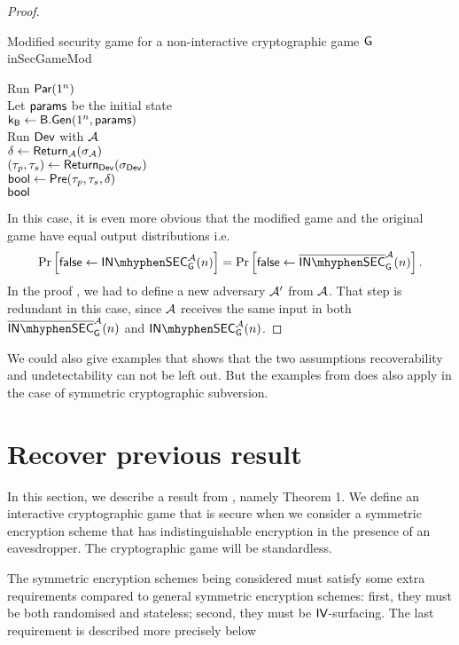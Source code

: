 \begin{proof}
\begin{boxfigGame}{Modified security game for a non-interactive cryptographic game $\operatorname{\mathsf{G}}$}{inSecGameMod}
\begin{description}
 		Run $\operatorname{\mathsf{Par}}(1^n)$ \\
 		Let $\mathsf{params}$ be the initial state \\
 		$\mathsf{k}_{\mathsf{B}}\leftarrow\mathsf{B}.\mathsf{Gen}(1^n,\mathsf{params})$ \\
		Run $\operatorname{\mathsf{Dev}}$ with $\mathcal{A}$ \\
 		$\delta\leftarrow\operatorname{\mathsf{Return}}_{\mathcal{A}}(\sigma_{\mathcal{A}})$ \\
 		$(\tau_p,\tau_s)\leftarrow \operatorname{\mathsf{Return}}_{\operatorname{\mathsf{Dev}}}(\sigma_{\operatorname{\mathsf{Dev}}})$ \\
 		$\mathsf{bool} \leftarrow \operatorname{\mathsf{Pre}}(\tau_p,\tau_s,\delta)$ \\
 		\Ret $\mathsf{bool}$		
  \end{description}
\end{boxfigGame}

In this case, it is even more obvious that the modified game and the original game have equal output distributions i.e.
\begin{align*}
	\prob{\false\leftarrow \insecgame_{\cgame}^{\adve}(n)} = \prob{\false \leftarrow \pneg{\insecgame}_{\cgame}^{\adve}(n)}.
\end{align*}
In the proof , we had to define a new adversary $\mathcal{A}'$ from $\mathcal{A}$. That step is redundant in this case, since $\mathcal{A}$ receives the same input in both $\pneg{\insecgame}_{\cgame}^{\adve}(n)$ and $\insecgame_{\cgame}^{\adve}(n)$.
\end{proof}

We could also give examples that shows that the two assumptions recoverability and undetectability can not be left out. But the examples from  does also apply in the case of symmetric cryptographic subversion. 

\section{Recover previous result}

In this section, we describe a result from \citep{DBLP:secSym}, namely Theorem 1. We define an interactive cryptographic game that is secure when we consider a symmetric encryption scheme that has indistinguishable encryption in the presence of an eavesdropper. The cryptographic game will be standardless. 

The symmetric encryption schemes being considered must satisfy some extra requirements compared to general symmetric encryption schemes: first, they must be both randomised and stateless; second, they must be $\mathsf{IV}$-surfacing. The last requirement is described more precisely below

